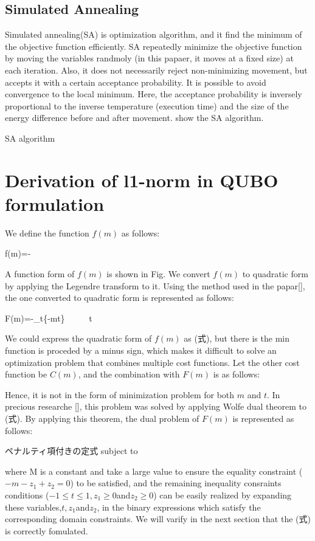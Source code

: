 \documentclass[fp,twocolumn]{jpsj3}
\begin{document}
\subsection{Simulated Annealing} %
Simulated annealing(SA) is optimization algorithm, and it find the minimum of the objective function efficiently. SA repeatedly minimize the objective function by moving the variables randmoly (in this papaer, it moves at a fixed size) at each iteration. Also, it does not necessarily reject non-minimizing movement, but accepts it with a certain acceptance probability. It is possible to avoid convergence to the local minimum. Here, the acceptance probability is inversely proportional to the inverse temperature (execution time) and the size of the energy difference before and after movement. \cite{} show the SA algorithm.

\begin{}
SA algorithm
\end{}

\section{Derivation of l1-norm in QUBO formulation} %
We define the function $f(m)$ as follows:
\begin{}
  f(m)=-
\end{}
A function form of $f(m)$ is shown in Fig. We convert $f(m)$ to quadratic form by applying the Legendre transform to it. Using the method used in the papar[], the one converted to quadratic form is represented as follows:
\begin{}
  F(m)=-\min_{t}{\{-mt\}} \  \  \  \leq t 
\end{}
We could express the quadratic form of $f(m)$ as (式), but there is the min function is proceded by a minus sign, which makes it difficult to solve an optimization problem that combines multiple cost functions. Let the other cost function be $C(m)$, and the combination with $F(m)$ is as follows:
\begin{}
\end{}
Hence, it is not in the form of minimization problem for both $m$ and $t$.
In precious researche [], this problem was solved by applying Wolfe dual theorem to (式). By applying this theorem, the dual problem of $F(m)$ is represented as follows:
\begin{}
ペナルティ項付きの定式
subject to 
\end{}
where M is a constant and take a large value to ensure the equality constraint ($-m-z_{1}+z_{2}=0$) to be satisfied, and the remaining inequality consraints conditions ($-1\leq t\leq 1, z_{1}\geq 0$and$z_{2}\geq 0$) can be easily realized by expanding these variables,$t,z_{1}$and$z_{2}$, in the binary expressions which satisfy the corresponding domain constraints. We will varify in the next section that the (式) is correctly fomulated. 
\end{document}
